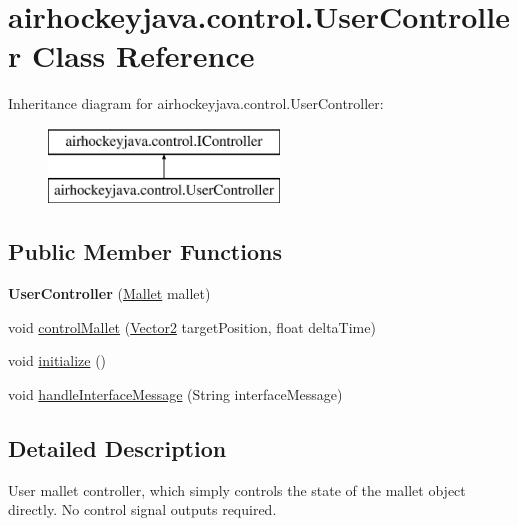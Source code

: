 \hypertarget{classairhockeyjava_1_1control_1_1_user_controller}{}\section{airhockeyjava.\+control.\+User\+Controller Class Reference}
\label{classairhockeyjava_1_1control_1_1_user_controller}
Inheritance diagram for airhockeyjava.\+control.\+User\+Controller\+:\begin{figure}[H]
\begin{center}
\leavevmode
\includegraphics[height=2.000000cm]{classairhockeyjava_1_1control_1_1_user_controller}
\end{center}
\end{figure}
\subsection*{Public Member Functions}
\begin{DoxyCompactItemize}
\item 
\hypertarget{classairhockeyjava_1_1control_1_1_user_controller_a6cb73facea6ff3d9df26ba344875d9e4}{}{\bfseries User\+Controller} (\hyperlink{classairhockeyjava_1_1physical_1_1_mallet}{Mallet} mallet)\label{classairhockeyjava_1_1control_1_1_user_controller_a6cb73facea6ff3d9df26ba344875d9e4}

\item 
void \hyperlink{classairhockeyjava_1_1control_1_1_user_controller_a1466f596c21f1383f085a5077b488d9e}{control\+Mallet} (\hyperlink{classairhockeyjava_1_1util_1_1_vector2}{Vector2} target\+Position, float delta\+Time)
\item 
void \hyperlink{classairhockeyjava_1_1control_1_1_user_controller_a484c04e0bd66d132ab0b18065de04dfc}{initialize} ()
\item 
void \hyperlink{classairhockeyjava_1_1control_1_1_user_controller_a3f542f1d405ba43761105c8746952669}{handle\+Interface\+Message} (String interface\+Message)
\end{DoxyCompactItemize}


\subsection{Detailed Description}
User mallet controller, which simply controls the state of the mallet object directly. No control signal outputs required.


